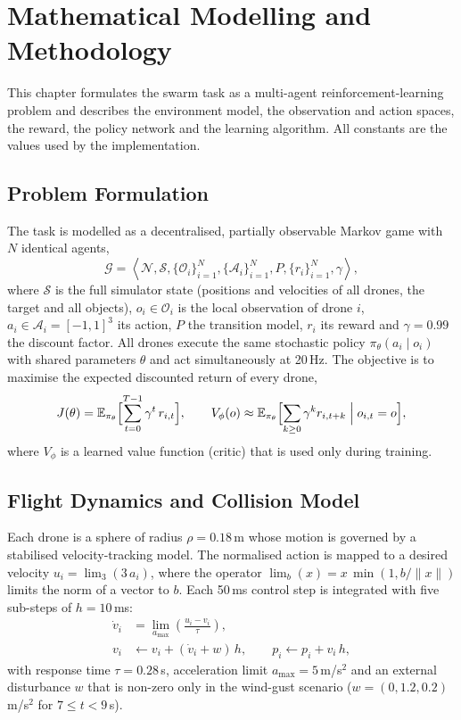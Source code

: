 \chapter{Mathematical Modelling and Methodology}
\label{ch:method}

This chapter formulates the swarm task as a multi-agent reinforcement-learning problem and describes the
environment model, the observation and action spaces, the reward, the policy network and the learning
algorithm. All constants are the values used by the implementation.

\section{Problem Formulation}
The task is modelled as a decentralised, partially observable Markov game with $N$ identical agents,
\begin{equation}
  \mathcal{G} = \left\langle \mathcal{N}, \mathcal{S}, \{\mathcal{O}_i\}_{i=1}^{N}, \{\mathcal{A}_i\}_{i=1}^{N},
  P, \{r_i\}_{i=1}^{N}, \gamma \right\rangle ,
  \label{eq:game}
\end{equation}
where $\mathcal{S}$ is the full simulator state (positions and velocities of all drones, the target and all
objects), $o_i \in \mathcal{O}_i$ is the local observation of drone $i$, $a_i \in \mathcal{A}_i=[-1,1]^3$ its
action, $P$ the transition model, $r_i$ its reward and $\gamma = 0.99$ the discount factor. All drones execute
the same stochastic policy $\pi_\theta(a_i \mid o_i)$ with shared parameters $\theta$ and act simultaneously
at 20\,Hz. The objective is to maximise the expected discounted return of every drone,
\begin{equation}
  J(\theta) = \mathbb{E}_{\pi_\theta}\Bigl[\sum_{t=0}^{T-1} \gamma^{t}\, r_{i,t}\Bigr],
  \qquad
  V_\phi(o) \approx \mathbb{E}_{\pi_\theta}\Bigl[\sum_{k \ge 0}\gamma^k r_{i,t+k} \Bigm| o_{i,t}=o\Bigr],
  \label{eq:objective}
\end{equation}
where $V_\phi$ is a learned value function (critic) that is used only during training.

\section{Flight Dynamics and Collision Model}
Each drone is a sphere of radius $\rho = 0.18$\,m whose motion is governed by a stabilised velocity-tracking
model. The normalised action is mapped to a desired velocity $u_i = \operatorname{lim}_{3}(3\,a_i)$, where the
operator $\operatorname{lim}_b(x) = x\,\min(1, b/\lVert x\rVert)$ limits the norm of a vector to $b$. Each
50\,ms control step is integrated with five sub-steps of $h = 10$\,ms:
\begin{align}
  \dot v_i &= \operatorname{lim}_{a_{\max}}\!\left(\frac{u_i - v_i}{\tau}\right), \label{eq:dyn1}\\
  v_i &\leftarrow v_i + (\dot v_i + w)\,h, \qquad p_i \leftarrow p_i + v_i\,h, \label{eq:dyn2}
\end{align}
with response time $\tau = 0.28$\,s, acceleration limit $a_{\max} = 5$\,m/s$^2$ and an external disturbance $w$
that is non-zero only in the wind-gust scenario ($w=(0,1.2,0.2)$\,m/s$^2$ for $7 \le t < 9$\,s).

